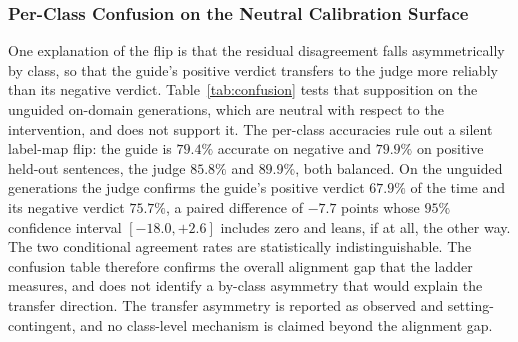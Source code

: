 \subsubsection{Per-Class Confusion on the Neutral Calibration Surface}
\label{app:guided-confusion}

One explanation of the flip is that the residual disagreement falls asymmetrically by class,
so that the guide's positive verdict transfers to the judge more reliably than its negative
verdict. Table~\ref{tab:confusion} tests that supposition on the unguided on-domain
generations, which are neutral with respect to the intervention, and does not support it. The
per-class accuracies rule out a silent label-map flip: the guide is $79.4\%$ accurate on
negative and $79.9\%$ on positive held-out sentences, the judge $85.8\%$ and $89.9\%$, both
balanced.
On the unguided generations the judge confirms the guide's positive verdict $67.9\%$ of the
time and its negative verdict $75.7\%$, a paired difference of $-7.7$ points whose $95\%$
confidence interval $[-18.0, +2.6]$ includes zero and leans, if at all, the other way.
The two conditional agreement rates are statistically indistinguishable. The confusion table
therefore confirms the overall alignment gap that the ladder measures, and does not identify a
by-class asymmetry that would explain the transfer direction. The transfer asymmetry is
reported as observed and setting-contingent, and no class-level mechanism is claimed beyond
the alignment gap.




